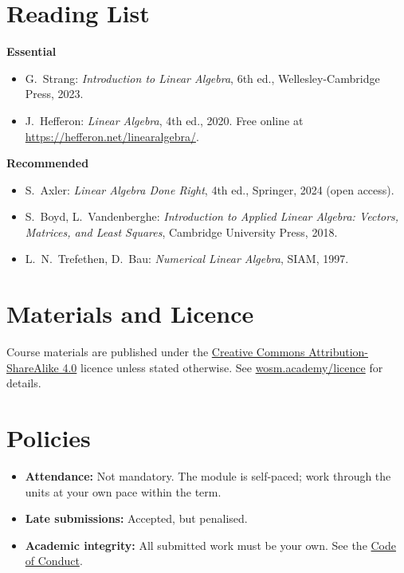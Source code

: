 \documentclass[11pt,a4paper]{article}
\begin{document}
\section{Reading List}
\textbf{Essential}
\begin{itemize}
  \item G.\ Strang: \textit{Introduction to Linear Algebra}, 6th ed., Wellesley-Cambridge Press, 2023.
  \item J.\ Hefferon: \textit{Linear Algebra}, 4th ed., 2020. Free online at \url{https://hefferon.net/linearalgebra/}.
\end{itemize}
\textbf{Recommended}
\begin{itemize}
  \item S.\ Axler: \textit{Linear Algebra Done Right}, 4th ed., Springer, 2024 (open access).
  \item S.\ Boyd, L.\ Vandenberghe: \textit{Introduction to Applied Linear Algebra: Vectors, Matrices, and Least Squares}, Cambridge University Press, 2018.
  \item L.\ N.\ Trefethen, D.\ Bau: \textit{Numerical Linear Algebra}, SIAM, 1997.
\end{itemize}

\section{Materials and Licence}
Course materials are published under the
\href{https://creativecommons.org/licenses/by-sa/4.0/}{Creative Commons Attribution-ShareAlike 4.0}
licence unless stated otherwise. See \href{https://wosm.academy/licence/}{wosm.academy/licence} for details.

\section{Policies}
\begin{itemize}
  \item \textbf{Attendance:} Not mandatory. The module is self-paced; work through the units at your own pace within the term.
  \item \textbf{Late submissions:} Accepted, but penalised.
  \item \textbf{Academic integrity:} All submitted work must be your own.
        See the \href{https://wosm.academy/code-of-conduct/}{Code of Conduct}.
\end{itemize}
\end{document}
